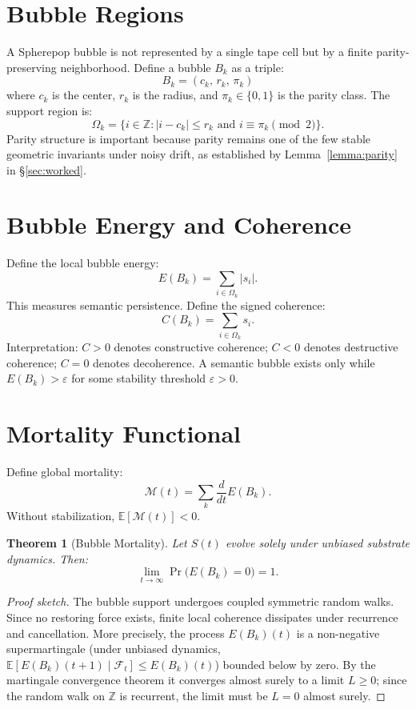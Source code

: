 \documentclass[11pt]{article}
\newtheorem{theorem}{Theorem}[section]
\begin{document}
\section{Bubble Regions}
\label{sec:bubbleregions}

A Spherepop bubble is not represented by a single tape cell but by a finite
parity-preserving neighborhood. Define a bubble $B_k$ as a triple:
\[
B_k = (c_k,\, r_k,\, \pi_k)
\]
where $c_k$ is the center, $r_k$ is the radius, and $\pi_k \in \{0,1\}$ is the
parity class. The support region is:
\[
\Omega_k = \bigl\{
i \in \mathbb{Z} : |i - c_k| \le r_k
\text{ and }
i \equiv \pi_k \pmod{2}
\bigr\}.
\]
Parity structure is important because parity remains one of the few stable
geometric invariants under noisy drift, as established by
Lemma~\ref{lemma:parity} in \S\ref{sec:worked}.

\section{Bubble Energy and Coherence}
\label{sec:energy}

Define the local bubble energy:
\[
E(B_k) = \sum_{i \in \Omega_k} |s_i|.
\]
This measures semantic persistence. Define the signed coherence:
\[
C(B_k) = \sum_{i \in \Omega_k} s_i.
\]
Interpretation: $C > 0$ denotes constructive coherence; $C < 0$ denotes
destructive coherence; $C = 0$ denotes decoherence. A semantic bubble exists
only while $E(B_k) > \varepsilon$ for some stability threshold $\varepsilon > 0$.

\section{Mortality Functional}
\label{sec:mortality}

Define global mortality:
\[
\mathcal{M}(t) = \sum_k \frac{d}{dt} E(B_k).
\]
Without stabilization, $\mathbb{E}[\mathcal{M}(t)] < 0$.

\begin{theorem}[Bubble Mortality]
\label{thm:mortality}
Let $S(t)$ evolve solely under unbiased substrate dynamics. Then:
\[
\lim_{t \to \infty} \Pr\bigl(E(B_k) = 0\bigr) = 1.
\]
\end{theorem}

\begin{proof}[Proof sketch]
The bubble support undergoes coupled symmetric random walks. Since no restoring
force exists, finite local coherence dissipates under recurrence and
cancellation. More precisely, the process $E(B_k)(t)$ is a non-negative
supermartingale (under unbiased dynamics, $\mathbb{E}[E(B_k)(t+1) \mid
\mathcal{F}_t] \leq E(B_k)(t)$) bounded below by zero. By the martingale
convergence theorem it converges almost surely to a limit $L \geq 0$; since
the random walk on $\mathbb{Z}$ is recurrent, the limit must be $L = 0$ almost
surely.
\end{proof}
\end{document}
